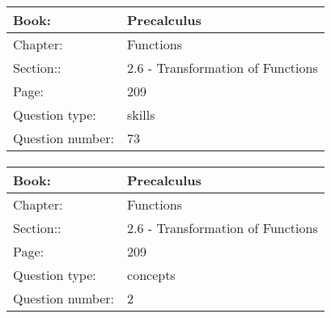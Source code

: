 \documentclass{article}
\begin{document}
            \paragraph{}
            \begin{tabularx}{1\textwidth}{
                    p{}
                    p{}
                }
                \toprule
                Book: & Precalculus
                \\
                \midrule
                Chapter: & Functions
                \\
                \midrule
                Section:: & 2.6 - Transformation of Functions
                \\
                \midrule
                Page: & 209
                \\
                \midrule
                Question type: & skills
                \\
                \midrule
                Question number: & 73
                \\
                \bottomrule
            \end{tabularx}
            
            \paragraph{}
            \begin{tabularx}{1\textwidth}{
                    p{}
                    p{}
                }
                \toprule
                Book: & Precalculus
                \\
                \midrule
                Chapter: & Functions
                \\
                \midrule
                Section:: & 2.6 - Transformation of Functions
                \\
                \midrule
                Page: & 209
                \\
                \midrule
                Question type: & concepts
                \\
                \midrule
                Question number: & 2
                \\
                \bottomrule
            \end{tabularx}
            
\end{document}
